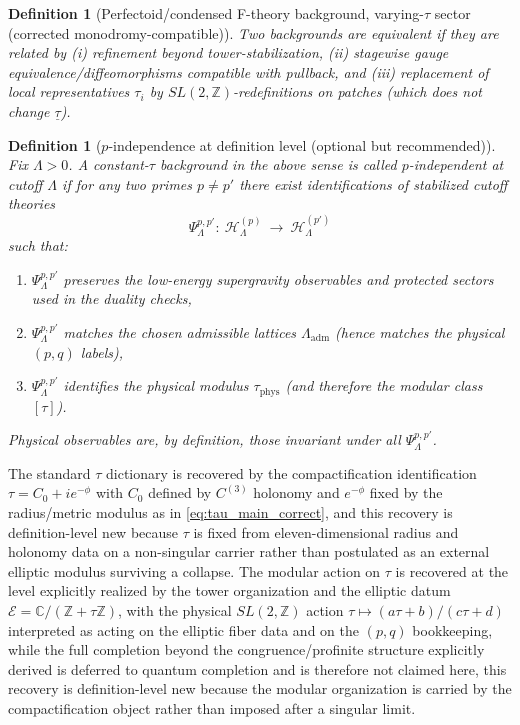 \documentclass[11pt]{article}
\newtheorem{definition}[theorem]{Definition}
\theoremstyle{remark}
\newcommand{\C}{\mathbb{C}}
\newcommand{\Z}{\mathbb{Z}}
\newcommand{\calE}{\mathcal{E}}
\begin{document}
\begin{definition}[Perfectoid/condensed F-theory background, varying-$\tau$ sector (corrected monodromy-compatible)]
\medskip
\noindent Two backgrounds are equivalent if they are related by (i) refinement beyond tower-stabilization,
(ii) stagewise gauge equivalence/diffeomorphisms compatible with pullback,
and (iii) replacement of local representatives $\tau_i$ by $SL(2,\mathbb{Z})$-redefinitions on patches (which does not change $\underline{\tau}$).
\end{definition}


\begin{definition}[$p$-independence at definition level (optional but recommended)]
Fix $\Lambda>0$.
A constant-$\tau$ background in the above sense is called \emph{$p$-independent at cutoff $\Lambda$}
if for any two primes $p\neq p'$ there exist identifications of stabilized cutoff theories
\begin{equation}
\Psi^{p,p'}_{\Lambda}:\ \mathcal{H}^{(p)}_{\Lambda}\ \longrightarrow\ \mathcal{H}^{(p')}_{\Lambda}
\end{equation}
such that:
\begin{enumerate}
\item $\Psi^{p,p'}_{\Lambda}$ preserves the low-energy supergravity observables and protected sectors used in the duality checks,
\item $\Psi^{p,p'}_{\Lambda}$ matches the chosen admissible lattices $\Lambda_{\mathrm{adm}}$ (hence matches the physical $(p,q)$ labels),
\item $\Psi^{p,p'}_{\Lambda}$ identifies the physical modulus $\tau_{\mathrm{phys}}$ (and therefore the modular class $[\tau]$).
\end{enumerate}
Physical observables are, by definition, those invariant under all $\Psi^{p,p'}_{\Lambda}$.
\end{definition}


The standard \(\tau\) dictionary is recovered by the compactification identification \(\tau=C_{0}+ie^{-\phi}\) with \(C_{0}\) defined by \(C^{(3)}\) holonomy and \(e^{-\phi}\) fixed by the radius/metric modulus as in \eqref{eq:tau_main_correct}, and this recovery is definition-level new because \(\tau\) is fixed from eleven-dimensional radius and holonomy data on a non-singular carrier rather than postulated as an external elliptic modulus surviving a collapse. The modular action on \(\tau\) is recovered at the level explicitly realized by the tower organization and the elliptic datum \(\calE=\C/(\Z+\tau\Z)\), with the physical \(SL(2,\Z)\) action \(\tau\mapsto (a\tau+b)/(c\tau+d)\) interpreted as acting on the elliptic fiber data and on the \((p,q)\) bookkeeping, while the full completion beyond the congruence/profinite structure explicitly derived is deferred to quantum completion and is therefore not claimed here, this recovery is definition-level new because the modular organization is carried by the compactification object rather than imposed after a singular limit. 
\end{document}
